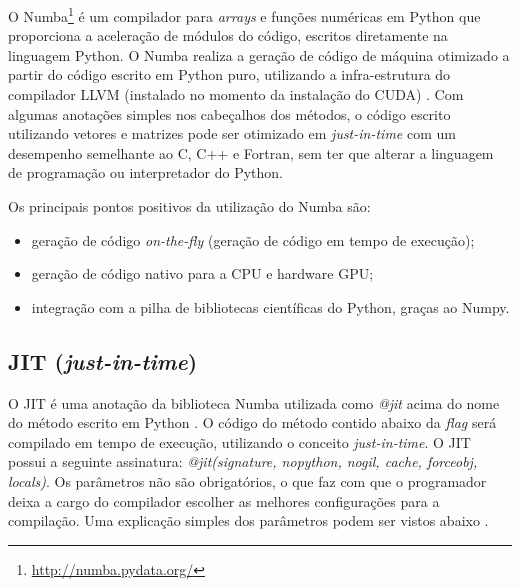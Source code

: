 \documentclass[
	12pt,				%
	twoside,			%
	a4paper,			%
	english,			%
	french,				%
	spanish,			%
	brazil				%
	]{abntex2}
\begin{document}
O Numba\footnote{\url{http://numba.pydata.org/}} é um compilador para
\emph{arrays} e funções numéricas em Python que proporciona a aceleração
de módulos do código, escritos diretamente na linguagem Python. O Numba
realiza a geração de código de máquina otimizado a partir do código
escrito em Python puro, utilizando a infra-estrutura do compilador LLVM
(instalado no momento da instalação do CUDA) \cite{LAM}. Com algumas
anotações simples nos cabeçalhos dos métodos, o código escrito
utilizando vetores e matrizes pode ser otimizado em \emph{just-in-time}
com um desempenho semelhante ao C, C++ e Fortran, sem ter que alterar a
linguagem de programação ou interpretador do Python.

Os principais pontos positivos da utilização do Numba são:

\begin{itemize}
\item
  geração de código \emph{on-the-fly} (geração de código em tempo de
  execução);
\item
  geração de código nativo para a CPU e hardware GPU;
\item
  integração com a pilha de bibliotecas científicas do Python, graças ao
  Numpy.
\end{itemize}

\subsection{\texorpdfstring{JIT
(\emph{just-in-time})}{JIT (just-in-time)}}\label{jit-just-in-time}

O JIT é uma anotação da biblioteca Numba utilizada como \emph{@jit}
acima do nome do método escrito em Python \cite{RIGO}. O código do
método contido abaixo da \emph{flag} será compilado em tempo de
execução, utilizando o conceito \emph{just-in-time}. O JIT possui a
seguinte assinatura: \emph{@jit(signature, nopython, nogil, cache,
forceobj, locals)}. Os parâmetros não são obrigatórios, o que faz com
que o programador deixa a cargo do compilador escolher as melhores
configurações para a compilação. Uma explicação simples dos parâmetros
podem ser vistos abaixo \cite{NUMBA}.
\end{document}
